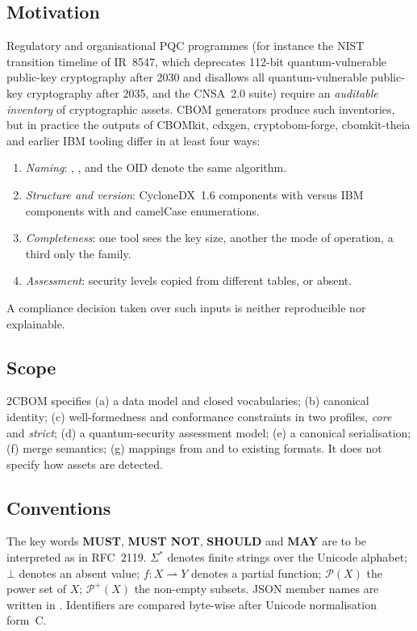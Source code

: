 \documentclass[11pt,a4paper]{article}
\newcommand{\twocbom}{2CBOM}
\newcommand{\MUST}{\textbf{MUST}}
\newcommand{\MUSTNOT}{\textbf{MUST NOT}}
\newcommand{\SHOULD}{\textbf{SHOULD}}
\newcommand{\MAY}{\textbf{MAY}}
\newcommand{\pfun}{\rightharpoonup}
\theoremstyle{definition}
\theoremstyle{plain}
\begin{document}
\subsection{Motivation}
Regulatory and organisational PQC programmes (for instance the NIST transition timeline of
IR~8547, which deprecates 112-bit quantum-vulnerable public-key cryptography after 2030 and
disallows all quantum-vulnerable public-key cryptography after 2035, and the CNSA~2.0 suite)
require an \emph{auditable inventory} of cryptographic assets. CBOM generators produce such
inventories, but in practice the outputs of CBOMkit, cdxgen, cryptobom-forge, cbomkit-theia and
earlier IBM tooling differ in at least four ways:
\begin{enumerate}[nosep]
  \item \emph{Naming}: , ,  and the OID
         denote the same algorithm.
  \item \emph{Structure and version}: CycloneDX~1.6  components with
         versus IBM  components with
         and camelCase enumerations.
  \item \emph{Completeness}: one tool sees the key size, another the mode of operation, a third only
        the family.
  \item \emph{Assessment}: security levels copied from different tables, or absent.
\end{enumerate}
A compliance decision taken over such inputs is neither reproducible nor explainable.

\subsection{Scope}
\twocbom{} specifies (a) a data model and closed vocabularies; (b) canonical identity;
(c) well-formedness and conformance constraints in two profiles, \emph{core} and \emph{strict};
(d) a quantum-security assessment model; (e) a canonical serialisation; (f) merge semantics;
(g) mappings from and to existing formats. It does not specify how assets are detected.

\subsection{Conventions}
The key words \MUST, \MUSTNOT, \SHOULD{} and \MAY{} are to be interpreted as in RFC~2119.
$\Sigma^{*}$ denotes finite strings over the Unicode alphabet; $\bot$ denotes an absent value;
$f: X \pfun Y$ denotes a partial function; $\mathcal{P}(X)$ the power set of $X$;
$\mathcal{P}^{+}(X)$ the non-empty subsets. JSON member names are written in .
Identifiers are compared byte-wise after Unicode normalisation form~C.
\end{document}
